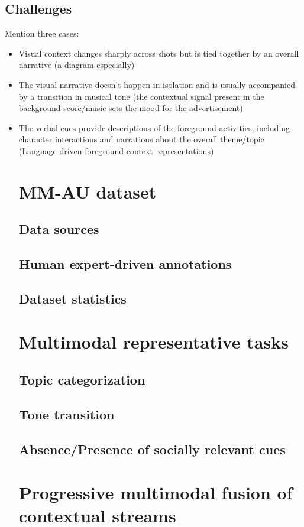 \subsection{Challenges}
Mention three cases:
\begin{itemize}
\item Visual context changes sharply across shots but is tied together by an overall narrative (a diagram especially)
\item The visual narrative doesn’t happen in isolation and is usually accompanied by a transition in musical tone (the contextual signal present in the background score/music sets the mood for the advertisement)
\item The verbal cues provide descriptions of the foreground activities, including character interactions and narrations about the overall theme/topic (Language driven foreground context representations)
\section{MM-AU dataset}
\subsection{Data sources}
\subsection{Human expert-driven annotations}
\subsection{Dataset statistics}
\section{Multimodal representative tasks}
\subsection{Topic categorization}
\subsection{Tone transition}
\subsection{Absence/Presence of socially relevant cues}
\section{Progressive multimodal fusion of contextual streams}

\end{itemize}
